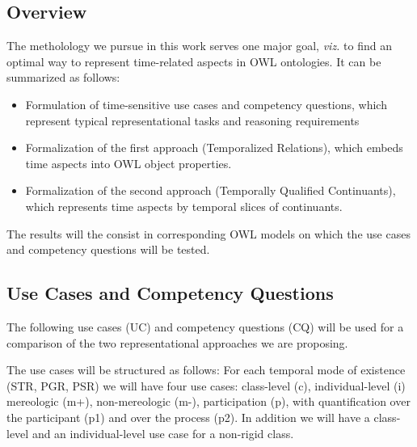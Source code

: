 \subsection*{Overview}
The metholology we pursue in this work serves one major goal, \emph{viz.} to find an optimal way to represent time-related aspects in OWL ontologies. 
It can be summarized as follows:

\begin{itemize}
\item
Formulation of time-sensitive use cases and competency questions, which represent typical representational tasks and reasoning requirements
\item
Formalization of the first approach (Temporalized Relations), which embeds time aspects into OWL object properties.
\item 
Formalization of the second approach (Temporally Qualified Continuants), which represents time aspects by temporal slices of continuants.  
\end{itemize}
The results will the consist in corresponding OWL models on which the use cases and competency questions will be tested. 


\subsection*{Use Cases and Competency Questions}
 
The following use cases (UC) and competency questions (CQ) will be used for a comparison of the two representational approaches we are proposing. 






The use cases will be structured as follows: For each temporal mode of existence (STR, PGR, PSR) we will have four use cases: 
class-level (c), individual-level (i) mereologic (m+), non-mereologic (m-), participation (p), with quantification over the participant (p1) and over the process (p2). In addition we will have a class-level and an individual-level use case for a non-rigid class. 

